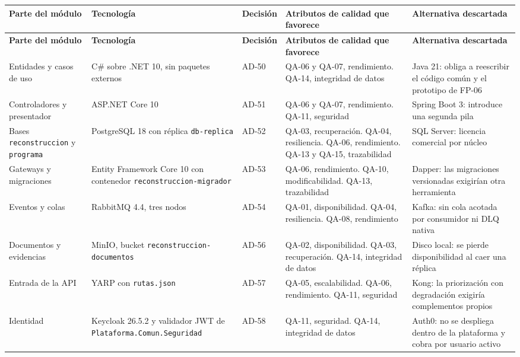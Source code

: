 \documentclass[11pt,a4paper]{article}
\begin{document}
{\small
\begin{longtable}{|P{2.5cm}|P{2.9cm}|P{1.2cm}|P{4.2cm}|P{3.4cm}|}
  \hline
  \textbf{Parte del módulo} & \textbf{Tecnología} & \textbf{Decisión} & \textbf{Atributos de calidad que favorece} & \textbf{Alternativa descartada} \\ \hline
  \endfirsthead
  \hline
  \textbf{Parte del módulo} & \textbf{Tecnología} & \textbf{Decisión} & \textbf{Atributos de calidad que favorece} & \textbf{Alternativa descartada} \\ \hline
  \endhead
  Entidades y casos de uso & C\# sobre .NET 10, sin paquetes externos & AD-50 & QA-06 y QA-07, rendimiento. QA-14, integridad de datos & Java 21: obliga a reescribir el código común y el prototipo de FP-06 \\ \hline
  Controladores y presentador & ASP.NET Core 10 & AD-51 & QA-06 y QA-07, rendimiento. QA-11, seguridad & Spring Boot 3: introduce una segunda pila \\ \hline
  Bases \texttt{reconstruccion} y \texttt{programa} & PostgreSQL 18 con réplica \texttt{db-replica} & AD-52 & QA-03, recuperación. QA-04, resiliencia. QA-06, rendimiento. QA-13 y QA-15, trazabilidad & SQL Server: licencia comercial por núcleo \\ \hline
  Gateways y migraciones & Entity Framework Core 10 con contenedor \texttt{reconstruccion-\allowbreak migrador} & AD-53 & QA-06, rendimiento. QA-10, modificabilidad. QA-13, trazabilidad & Dapper: las migraciones versionadas exigirían otra herramienta \\ \hline
  Eventos y colas & RabbitMQ 4.4, tres nodos & AD-54 & QA-01, disponibilidad. QA-04, resiliencia. QA-08, rendimiento & Kafka: sin cola acotada por consumidor ni DLQ nativa \\ \hline
  Documentos y evidencias & MinIO, bucket \texttt{reconstruccion-\allowbreak documentos} & AD-56 & QA-02, disponibilidad. QA-03, recuperación. QA-14, integridad de datos & Disco local: se pierde disponibilidad al caer una réplica \\ \hline
  Entrada de la API & YARP con \texttt{rutas.json} & AD-57 & QA-05, escalabilidad. QA-06, rendimiento. QA-11, seguridad & Kong: la priorización con degradación exigiría complementos propios \\ \hline
  Identidad & Keycloak 26.5.2 y validador JWT de \texttt{Plataforma.\allowbreak Comun.\allowbreak Seguridad} & AD-58 & QA-11, seguridad. QA-14, integridad de datos & Auth0: no se despliega dentro de la plataforma y cobra por usuario activo \\ \hline

\end{longtable}}
\end{document}
